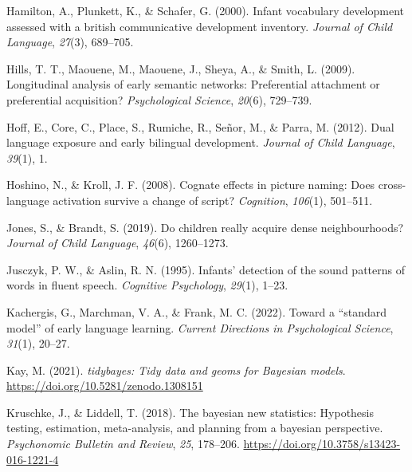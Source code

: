 \documentclass[
  letterpaper,
  DIV=11,
  numbers=noendperiod]{scrartcl}
\newlength{\cslhangindent}
\newlength{\cslentryspacingunit} %
\newenvironment{CSLReferences}[2] %
 {%
  \setlength{\parindent}{0pt}
  \ifodd #1
  \let\oldpar\par
  \def\par{\hangindent=\cslhangindent\oldpar}
  \fi
  \setlength{\parskip}{#2\cslentryspacingunit}
 }%
 {}
\begin{document}
\begin{CSLReferences}{1}{0}
\leavevmode{}%
Hamilton, A., Plunkett, K., \& Schafer, G. (2000). Infant vocabulary
development assessed with a british communicative development inventory.
\emph{Journal of Child Language}, \emph{27}(3), 689--705.

\leavevmode{}%
Hills, T. T., Maouene, M., Maouene, J., Sheya, A., \& Smith, L. (2009).
Longitudinal analysis of early semantic networks: Preferential
attachment or preferential acquisition? \emph{Psychological Science},
\emph{20}(6), 729--739.

\leavevmode{}%
Hoff, E., Core, C., Place, S., Rumiche, R., Señor, M., \& Parra, M.
(2012). Dual language exposure and early bilingual development.
\emph{Journal of Child Language}, \emph{39}(1), 1.

\leavevmode{}%
Hoshino, N., \& Kroll, J. F. (2008). Cognate effects in picture naming:
Does cross-language activation survive a change of script?
\emph{Cognition}, \emph{106}(1), 501--511.

\leavevmode{}%
Jones, S., \& Brandt, S. (2019). Do children really acquire dense
neighbourhoods? \emph{Journal of Child Language}, \emph{46}(6),
1260--1273.

\leavevmode{}%
Jusczyk, P. W., \& Aslin, R. N. (1995). Infants' detection of the sound
patterns of words in fluent speech. \emph{Cognitive Psychology},
\emph{29}(1), 1--23.

\leavevmode{}%
Kachergis, G., Marchman, V. A., \& Frank, M. C. (2022). Toward a
{``standard model''} of early language learning. \emph{Current
Directions in Psychological Science}, \emph{31}(1), 20--27.

\leavevmode{}%
Kay, M. (2021). \emph{{tidybayes}: Tidy data and geoms for {Bayesian}
models}. \url{https://doi.org/10.5281/zenodo.1308151}

\leavevmode{}%
Kruschke, J., \& Liddell, T. (2018). The bayesian new statistics:
Hypothesis testing, estimation, meta-analysis, and planning from a
bayesian perspective. \emph{Psychonomic Bulletin and Review}, \emph{25},
178--206. \url{https://doi.org/10.3758/s13423-016-1221-4}


\end{CSLReferences}
\end{document}
